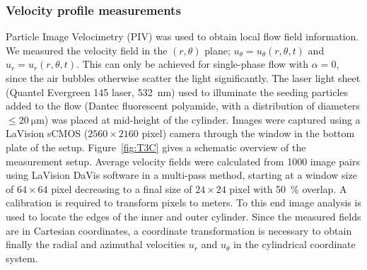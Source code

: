 \subsubsection{Velocity profile measurements}
Particle Image Velocimetry (PIV) was used to obtain local flow field information. We measured the velocity field in the $(r,\theta)$ plane; $u_\theta = u_\theta (r,\theta,t)$ and $u_r = u_r (r,\theta,t)$. This can only be achieved for single-phase flow with $\alpha = 0$, since the air bubbles otherwise scatter the light significantly. The laser light sheet (Quantel Evergreen 145 laser, \SI{532}{\nm}) used to illuminate the seeding particles added to the flow (Dantec fluorescent polyamide, with a distribution of diameters $\leq \SI{20}{\um}$) was placed at mid-height of the cylinder. Images were captured using a LaVision sCMOS ($2560\times2160$ pixel) camera through the window in the bottom plate of the setup. Figure~\ref{fig:T3C} gives a schematic overview of the measurement setup. Average velocity fields were calculated from 1000 image pairs using LaVision DaVis software in a multi-pass method, starting at a window size of $64\times64$ pixel decreasing to a final size of $24\times24$ pixel with \SI{50}{\percent} overlap.
A calibration is required to transform pixels to meters. To this end image analysis is used to locate the edges of the inner and outer cylinder. Since the measured fields are in Cartesian coordinates, a coordinate transformation is necessary to obtain finally the radial and azimuthal velocities $u_r$ and $u_\theta$ in the cylindrical coordinate system.
